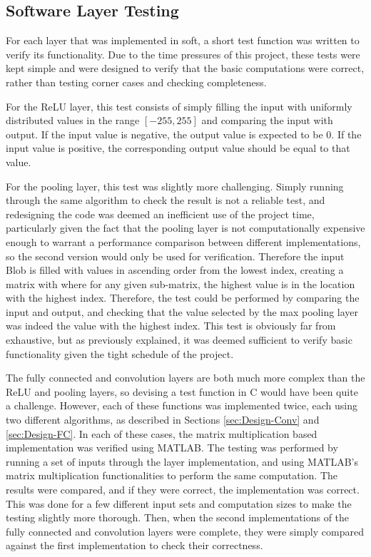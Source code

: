 \documentclass[12pt]{article}
\begin{document}
\subsection{Software Layer Testing}
\label{sec:Test-Layers}

For each layer that was implemented in soft, a short test function was written to verify its functionality. Due to the time pressures of this project, these tests were kept simple and were designed to verify that the basic computations were correct, rather than testing corner cases and checking completeness.

For the ReLU layer, this test consists of simply filling the input with uniformly distributed values in the range $[-255, 255]$ and comparing the input with output. If the input value is negative, the output value is expected to be $0$. If the input value is positive, the corresponding output value should be equal to that value.

For the pooling layer, this test was slightly more challenging. Simply running through the same algorithm to check the result is not a reliable test, and redesigning the code was deemed an inefficient use of the project time, particularly given the fact that the pooling layer is not computationally expensive enough to warrant a performance comparison between different implementations, so the second version would only be used for verification. Therefore the input Blob is filled with values in ascending order from the lowest index, creating a matrix with where for any given sub-matrix, the highest value is in the location with the highest index. Therefore, the test could be performed by comparing the input and output, and checking that the value selected by the max pooling layer was indeed the value with the highest index. This test is obviously far from exhaustive, but as previously explained, it was deemed sufficient to verify basic functionality given the tight schedule of the project.

The fully connected and convolution layers are both much more complex than the ReLU and pooling layers, so devising a test function in C would have been quite a challenge. However, each of these functions was implemented twice, each using two different algorithms, as described in Sections \ref{sec:Design-Conv} and \ref{sec:Design-FC}. In each of these cases, the matrix multiplication based implementation was verified using MATLAB. The testing was performed by running a set of inputs through the layer implementation, and using MATLAB's matrix multiplication functionalities to perform the same computation. The results were compared, and if they were correct, the implementation was correct. This was done for a few different input sets and computation sizes to make the testing slightly more thorough. Then, when the second implementations of the fully connected and convolution layers were complete, they were simply compared against the first implementation to check their correctness.
\end{document}
